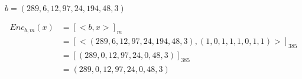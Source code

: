 \documentclass{../crypto}
\begin{document}
\subsection{}

$b = (289, 6, 12, 97, 24, 194, 48, 3)$

\begin{align*}
   Enc_{b,m}(x)  & = [<b,x>]_m                                                            \\
                 & =  [<(289, 6, 12, 97, 24, 194, 48, 3),(1, 0, 1, 1, 1, 0, 1, 1)>]_{385} \\
                 & =  [(289, 0, 12, 97, 24, 0, 48, 3)]_{385}                              \\
                 & =  (289, 0, 12, 97, 24, 0, 48, 3)
\end{align*}

\subsection{}
\end{document}

